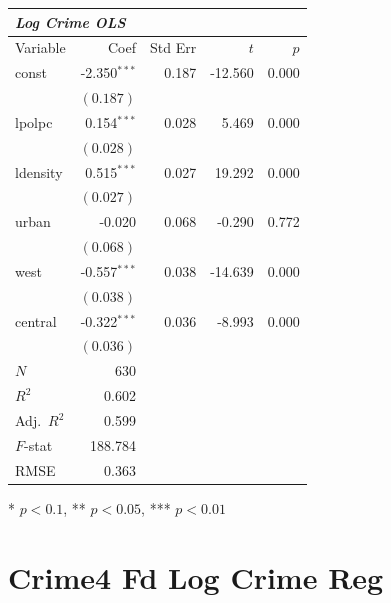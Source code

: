 \documentclass{article}
\begin{document}
\renewcommand{\arraystretch}{1.1}
\setlength{\tabcolsep}{6pt}
\begin{table}[H]
\centering
\begin{tabular}{lrrrr}
\hline
\multicolumn{5}{l}{\textit{Log Crime OLS}} \\
\hline
Variable & Coef & Std Err & $t$ & $p$ \\
\hline
const & -2.350$^{\ast\ast\ast}$ & 0.187 & -12.560 & 0.000 \\
 & $(0.187)$ & & & \\
lpolpc & 0.154$^{\ast\ast\ast}$ & 0.028 & 5.469 & 0.000 \\
 & $(0.028)$ & & & \\
ldensity & 0.515$^{\ast\ast\ast}$ & 0.027 & 19.292 & 0.000 \\
 & $(0.027)$ & & & \\
urban & -0.020 & 0.068 & -0.290 & 0.772 \\
 & $(0.068)$ & & & \\
west & -0.557$^{\ast\ast\ast}$ & 0.038 & -14.639 & 0.000 \\
 & $(0.038)$ & & & \\
central & -0.322$^{\ast\ast\ast}$ & 0.036 & -8.993 & 0.000 \\
 & $(0.036)$ & & & \\
\hline
$N$ & 630 & & & \\
$R^2$ & 0.602 & & & \\
Adj.\ $R^2$ & 0.599 & & & \\
$F$-stat & 188.784 & & & \\
RMSE & 0.363 & & & \\
\hline
\end{tabular}
\end{table}
\vspace{2pt}
\begin{flushleft}\footnotesize{* $p<0.1$, ** $p<0.05$, *** $p<0.01$}\end{flushleft}

\clearpage
\section*{Crime4 Fd Log Crime Reg}
\end{document}
